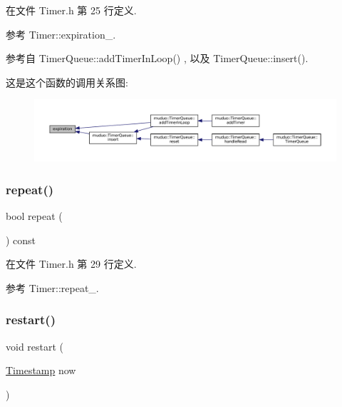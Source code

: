 在文件 Timer.\+h 第 25 行定义.



参考 Timer\+::expiration\+\_\+.



参考自 Timer\+Queue\+::add\+Timer\+In\+Loop() , 以及 Timer\+Queue\+::insert().

这是这个函数的调用关系图\+:
\nopagebreak
\begin{figure}[H]
\begin{center}
\leavevmode
\includegraphics[width=350pt]{classmuduo_1_1Timer_afa0ac5aa813b96802d509cf972054108_icgraph}
\end{center}
\end{figure}
\mbox{\label{classmuduo_1_1Timer_a24898cae728c6bc6d1a3c3e6bdd977b2}} 
\subsubsection{\texorpdfstring{repeat()}{repeat()}}
{\footnotesize\ttfamily bool repeat (\begin{DoxyParamCaption}{ }\end{DoxyParamCaption}) const\hspace{0.3cm}{\ttfamily [inline]}}



在文件 Timer.\+h 第 29 行定义.



参考 Timer\+::repeat\+\_\+.

\mbox{\label{classmuduo_1_1Timer_af96f08cc8d7b3f18df9ce1a305d56ae9}} 
\subsubsection{\texorpdfstring{restart()}{restart()}}
{\footnotesize\ttfamily void restart (\begin{DoxyParamCaption}\item[{\hyperlink{classmuduo_1_1Timestamp}{Timestamp}}]{now }\end{DoxyParamCaption})}



